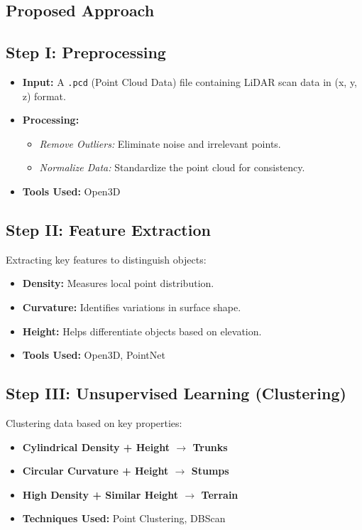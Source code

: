 \documentclass[../report.tex]{subfiles}
\begin{document}
{    \subsection{Proposed Approach}
    
    \label{sec:introduction:proposed_approach}

    \subsection{Step I: Preprocessing}
\begin{itemize}
    \item \textbf{Input:} A \texttt{.pcd} (Point Cloud Data) file containing LiDAR scan data in (x, y, z) format.
    \item \textbf{Processing:}
    \begin{itemize}
        \item \textit{Remove Outliers:} Eliminate noise and irrelevant points.
        \item \textit{Normalize Data:} Standardize the point cloud for consistency.
    \end{itemize}
    \item \textbf{Tools Used:} Open3D
\end{itemize}

\subsection{Step II: Feature Extraction}
Extracting key features to distinguish objects:
\begin{itemize}
    \item \textbf{Density:} Measures local point distribution.
    \item \textbf{Curvature:} Identifies variations in surface shape.
    \item \textbf{Height:} Helps differentiate objects based on elevation.
    \item \textbf{Tools Used:} Open3D, PointNet
\end{itemize}

\subsection{Step III: Unsupervised Learning (Clustering)}
Clustering data based on key properties:
\begin{itemize}
    \item \textbf{Cylindrical Density + Height $\rightarrow$ Trunks}
    \item \textbf{Circular Curvature + Height $\rightarrow$ Stumps}
    \item \textbf{High Density + Similar Height $\rightarrow$ Terrain}
    \item \textbf{Techniques Used:} Point Clustering, DBScan
\end{itemize}

}
\end{document}
